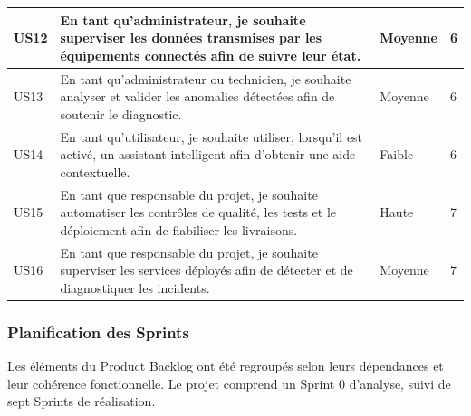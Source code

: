 \begin{longtable}{|p{0.9cm}|p{9.4cm}|p{1.5cm}|p{1.2cm}|}
\hline
US12 & En tant qu’administrateur, je souhaite superviser les données transmises par les équipements connectés afin de suivre leur état. & Moyenne & 6 \\
\hline
US13 & En tant qu’administrateur ou technicien, je souhaite analyser et valider les anomalies détectées afin de soutenir le diagnostic. & Moyenne & 6 \\
\hline
US14 & En tant qu’utilisateur, je souhaite utiliser, lorsqu’il est activé, un assistant intelligent afin d’obtenir une aide contextuelle. & Faible & 6 \\
\hline
US15 & En tant que responsable du projet, je souhaite automatiser les contrôles de qualité, les tests et le déploiement afin de fiabiliser les livraisons. & Haute & 7 \\
\hline
US16 & En tant que responsable du projet, je souhaite superviser les services déployés afin de détecter et de diagnostiquer les incidents. & Moyenne & 7 \\
\hline
\end{longtable}

\subsubsection{Planification des Sprints}

Les éléments du Product Backlog ont été regroupés selon leurs dépendances et leur cohérence fonctionnelle. Le projet comprend un Sprint 0 d’analyse, suivi de sept Sprints de réalisation.


